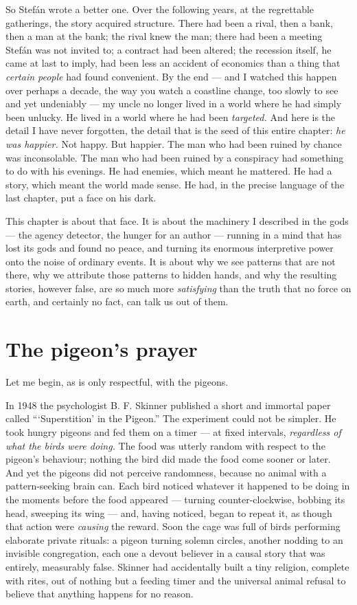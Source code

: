 So Stefán wrote a better one. Over the following years, at the regrettable gatherings, the story acquired structure. There had been a rival, then a bank, then a man at the bank; the rival knew the man; there had been a meeting Stefán was not invited to; a contract had been altered; the recession itself, he came at last to imply, had been less an accident of economics than a thing that \emph{certain people} had found convenient. By the end — and I watched this happen over perhaps a decade, the way you watch a coastline change, too slowly to see and yet undeniably — my uncle no longer lived in a world where he had simply been unlucky. He lived in a world where he had been \emph{targeted.} And here is the detail I have never forgotten, the detail that is the seed of this entire chapter: \emph{he was happier.} Not happy. But happier. The man who had been ruined by chance was inconsolable. The man who had been ruined by a conspiracy had something to do with his evenings. He had enemies, which meant he mattered. He had a story, which meant the world made sense. He had, in the precise language of the last chapter, put a face on his dark.

This chapter is about that face. It is about the machinery I described in the gods — the agency detector, the hunger for an author — running in a mind that has lost its gods and found no peace, and turning its enormous interpretive power onto the noise of ordinary events. It is about why we see patterns that are not there, why we attribute those patterns to hidden hands, and why the resulting stories, however false, are so much more \emph{satisfying} than the truth that no force on earth, and certainly no fact, can talk us out of them.

\section*{The pigeon's prayer}

Let me begin, as is only respectful, with the pigeons.

In 1948 the psychologist B. F. Skinner published a short and immortal paper called ```Superstition' in the Pigeon.'' The experiment could not be simpler. He took hungry pigeons and fed them on a timer — at fixed intervals, \emph{regardless of what the birds were doing.} The food was utterly random with respect to the pigeon's behaviour; nothing the bird did made the food come sooner or later. And yet the pigeons did not perceive randomness, because no animal with a pattern-seeking brain can. Each bird noticed whatever it happened to be doing in the moments before the food appeared — turning counter-clockwise, bobbing its head, sweeping its wing — and, having noticed, began to repeat it, as though that action were \emph{causing} the reward. Soon the cage was full of birds performing elaborate private rituals: a pigeon turning solemn circles, another nodding to an invisible congregation, each one a devout believer in a causal story that was entirely, measurably false. Skinner had accidentally built a tiny religion, complete with rites, out of nothing but a feeding timer and the universal animal refusal to believe that anything happens for no reason.

